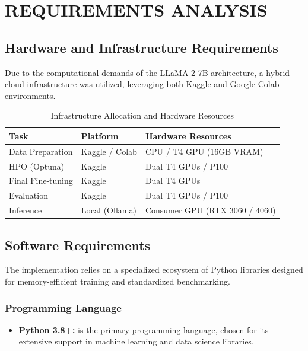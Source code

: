 \chapter{REQUIREMENTS ANALYSIS}
\section{Hardware and Infrastructure Requirements}
Due to the computational demands of the LLaMA-2-7B architecture, a hybrid cloud infrastructure was utilized, leveraging both Kaggle and Google Colab environments.

\begin{table}[h]
    \centering
    \caption{Infrastructure Allocation and Hardware Resources}
    \begin{tabular}{|l|l|l|}
        \hline
        \textbf{Task} & \textbf{Platform} & \textbf{Hardware Resources} \\ \hline
        Data Preparation & Kaggle / Colab & CPU / T4 GPU (16GB VRAM) \\ \hline
        HPO (Optuna) & Kaggle & Dual T4 GPUs / P100 \\ \hline
        Final Fine-tuning & Kaggle & Dual T4 GPUs \\ \hline
        Evaluation & Kaggle & Dual T4 GPUs / P100 \\ \hline
        Inference & Local (Ollama) & Consumer GPU (RTX 3060 / 4060) \\ \hline
    \end{tabular}
\end{table}

\section{Software Requirements}
The implementation relies on a specialized ecosystem of Python libraries designed for memory-efficient training and standardized benchmarking.

\subsection{Programming Language}
\begin{itemize}
    \item \textbf{Python 3.8+:} is the primary programming language, chosen for its extensive support in machine learning and data science libraries.
\end{itemize}

